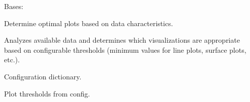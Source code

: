 \documentclass[a4paper,11pt,english,openany,oneside]{sphinxmanual}
\begin{document}
\begin{fulllineitems}
\label{\detokenize{modules/core:core.analysis.PlotStrategy}}
\pysigstartsignatures
\pysiglinewithargsret
{}
{}
{}
\pysigstopsignatures
\sphinxAtStartPar
Bases: 

\sphinxAtStartPar
Determine optimal plots based on data characteristics.

\sphinxAtStartPar
Analyzes available data and determines which visualizations are
appropriate based on configurable thresholds (minimum values for
line plots, surface plots, etc.).

\begin{fulllineitems}
\label{\detokenize{modules/core:core.analysis.PlotStrategy.config}}
\pysigstartsignatures
\pysigline
{}
\pysigstopsignatures
\sphinxAtStartPar
Configuration dictionary.
\begin{quote}\begin{description}
\sphinxAtStartPar
{}

\end{description}\end{quote}

\end{fulllineitems}


\begin{fulllineitems}
\label{\detokenize{modules/core:core.analysis.PlotStrategy.thresholds}}
\pysigstartsignatures
\pysigline
{}
\pysigstopsignatures
\sphinxAtStartPar
Plot thresholds from config.
\begin{quote}\begin{description}
\sphinxAtStartPar
{}

\end{description}\end{quote}


\end{fulllineitems}
\end{fulllineitems}
\end{document}
